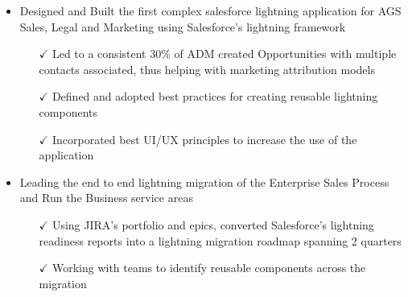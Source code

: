 \begin{itemize} \itemsep -2pt %
 \item 
 Designed and Built the first complex salesforce lightning application for AGS Sales, Legal and Marketing using Salesforce's lightning framework
 \itemsep -2pt
   \begin{itemize}
     \item[$\checkmark$]  \itemsep -8pt%
  Led to a consistent 30\% of ADM created Opportunities with multiple contacts associated, thus helping with marketing attribution models
\\
     \item[$\checkmark$]  \itemsep -8pt%
   Defined and adopted best practices for creating reusable lightning components \\
     \item[$\checkmark$]  \itemsep -8pt%
   Incorporated best UI/UX principles to increase the use of the application \\
        \end{itemize}       
\end{itemize}

 \begin{itemize} \itemsep -2pt %
 \item 
Leading the end to end lightning migration of the Enterprise Sales Process and Run the Business service areas \itemsep -2pt
   \begin{itemize}
     \item[$\checkmark$]  \itemsep -8pt%
    Using JIRA's portfolio and epics,  converted Salesforce's lightning readiness reports into a lightning migration roadmap spanning 2 quarters \\
     \item[$\checkmark$]  \itemsep -8pt%
    Working with teams to identify reusable components across the migration \\
            \end{itemize}       
\end{itemize}

